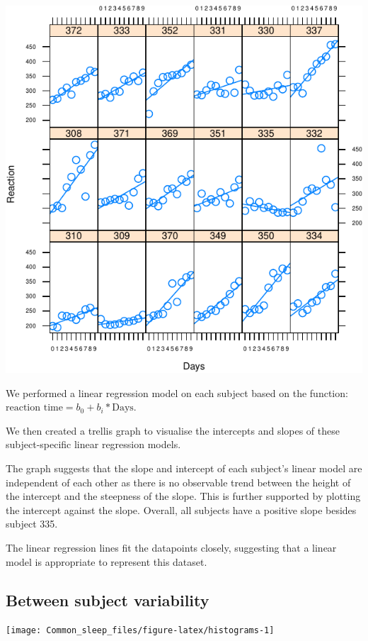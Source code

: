 \documentclass[
]{article}
\begin{document}
\begin{center}\includegraphics[width=0.8\linewidth]{Common_sleep_files/figure-latex/trellis-1} \end{center}

We performed a linear regression model on each subject based on the
function: \(\text{reaction time} = b_0 + b_i* \text{Days}\).

We then created a trellis graph to visualise the intercepts and slopes
of these subject-specific linear regression models.

The graph suggests that the slope and intercept of each subject's linear
model are independent of each other as there is no observable trend
between the height of the intercept and the steepness of the slope. This
is further supported by plotting the intercept against the slope.
Overall, all subjects have a positive slope besides subject 335.

The linear regression lines fit the datapoints closely, suggesting that
a linear model is appropriate to represent this dataset.

\hypertarget{between-subject-variability}{%
\subsection{Between subject
variability}\label{between-subject-variability}}

\begin{center}\texttt{[image: Common\_sleep\_files/figure-latex/histograms-1]} \end{center}
\end{document}
